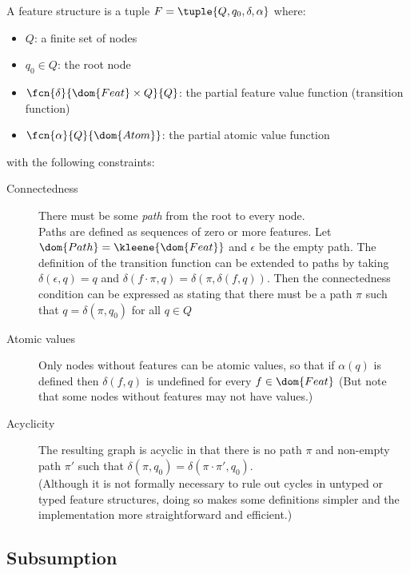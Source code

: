 \documentclass[12pt]{report}
\begin{document}
\begin{definition}
A feature structure is a tuple $F =
\tuple{Q,q_{0},\delta,\alpha}$ where:
\begin{itemize}
\item
$Q$:  a finite set of nodes 
\item
$q_{0} \in Q$: the root node
\item
$\fcn{\delta}{\dom{Feat} \times Q}{Q}$:  
the partial feature value function (transition function)
\item
$\fcn{\alpha}{Q}{\dom{Atom}}$: the partial atomic value function
\end{itemize}
with the following constraints:
\begin{description}
\item [Connectedness] 
There must be some {\em path} from the root to every node.\\
Paths are defined as sequences of zero or more features.
Let $\dom{Path} = \kleene{\dom{Feat}}$ and $\epsilon$ be the empty path.  
The definition of the transition function can be extended to paths by taking
$\delta(\epsilon,q) = q$ and $\delta(f\cdot\pi, q) =
\delta(\pi,\delta(f,q))$.  Then the connectedness condition
can be expressed as stating that there must be a path 
$\pi$ such that $q = \delta(\pi,q_{0})$ for all $q \in Q$
\item [Atomic values]
Only nodes without features can be atomic values, so that if
$\alpha(q)$ is defined then $\delta(f,q)$ is undefined for every $f
\in \dom{Feat}$
{\rm (But note that some nodes without
features may not have values.)}
\item [Acyclicity] The resulting graph is acyclic in that
there is no path $\pi$ and non-empty path $\pi'$ such that
$\delta(\pi,q_{0}) = \delta(\pi \cdot \pi',q_{0})$. \\
{\rm (Although it is not formally 
necessary to rule out cycles in untyped or typed
feature structures, doing so makes some definitions 
simpler and the implementation more straightforward and efficient.)}
\end{description}
\end{definition}

\subsection{Subsumption}
\label{untsub}
\end{document}
